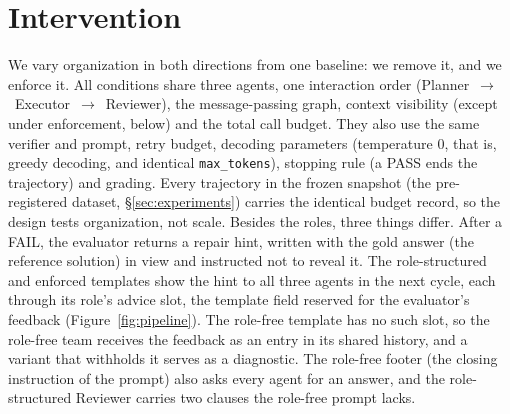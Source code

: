 \section{Intervention}
\label{sec:method}

We vary organization in both directions from one baseline: we remove it, and
we enforce it. All conditions share three agents, one interaction order
(Planner~$\rightarrow$~Executor~$\rightarrow$~Reviewer), the message-passing
graph, context visibility (except under enforcement, below) and the total
call budget. They also use the same verifier and prompt, retry budget,
decoding parameters (temperature $0$, that is, greedy decoding, and
identical \texttt{max\_tokens}), stopping rule (a PASS ends the trajectory)
and grading. Every trajectory in the frozen snapshot (the pre-registered dataset,
\S\ref{sec:experiments}) carries the identical
budget record, so the design tests organization, not scale. Besides the
roles, three things differ. After a FAIL, the evaluator returns a repair
hint, written with the gold answer (the reference solution) in view and
instructed not to reveal it. The role-structured and enforced templates show
the hint to all three agents in the next cycle, each through its role's
advice slot, the template field reserved for the evaluator's feedback
(Figure~\ref{fig:pipeline}). The role-free template has no such slot, so
the role-free team receives the feedback as an entry in its shared history,
and a variant that withholds it serves as a diagnostic. The
role-free footer (the closing instruction of the prompt) also asks every
agent for an answer, and the role-structured Reviewer carries two clauses
the role-free prompt lacks.

